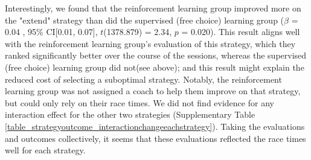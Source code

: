 \documentclass[pdflatex,sn-nature]{sn-jnl}%
\theoremstyle{thmstyleone}%
\theoremstyle{thmstyletwo}%
\theoremstyle{thmstylethree}%
\begin{document}
Interestingly, we found that the reinforcement learning group improved more on the "extend" strategy than did the supervised (free choice) learning group ($\beta$ = 0.04 , 95\% CI[0.01, 0.07], $t$(1378.879) = 2.34, $p$ = 0.020). This result aligns well with the reinforcement learning group's evaluation of this strategy, which they ranked significantly better over the course of the sessions, whereas the supervised (free choice) learning group did not(see above); and this result might explain the reduced cost of selecting a suboptimal strategy. Notably, the reinforcement learning group was not assigned a coach to help them improve on that strategy, but could only rely on their race times. We did not find evidence for any interaction effect for the other two strategies (Supplementary Table \ref{table_strategyoutcome_interactionchangeeachstrategy}). Taking the evaluations and outcomes collectively, it seems that these evaluations reflected the race times well for each strategy.
\end{document}

